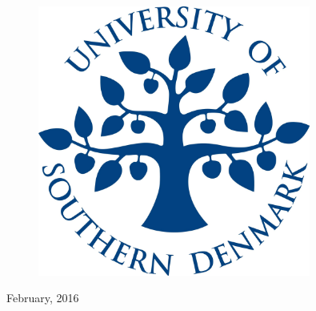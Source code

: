 \begin{center}


\begin{figure}[htbp]
\centering
\includegraphics[height=0.8\measurepage,width=0.8\textwidth,keepaspectratio]{logo.jpg} %
\end{figure} 
\vspace{1cm}
{\Huge February, 2016}\\[1cm]
\end{center}
 \thispagestyle{empty}

\vfill %

